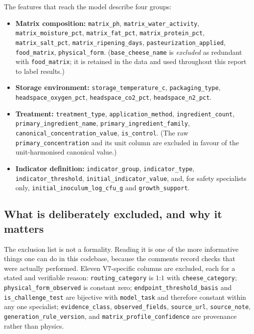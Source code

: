 The features that reach the model describe four groups:

\begin{itemize}[leftmargin=1.3em, itemsep=1pt]
\item \textbf{Matrix composition:} \texttt{matrix\_ph},
  \texttt{matrix\_water\_activity}, \texttt{matrix\_moisture\_pct},
  \texttt{matrix\_fat\_pct}, \texttt{matrix\_protein\_pct},
  \texttt{matrix\_salt\_pct}, \texttt{matrix\_ripening\_days},
  \texttt{pasteurization\_applied}, \texttt{food\_matrix},
  \texttt{physical\_form}. (\texttt{base\_cheese\_name} is \emph{excluded}
  as redundant with \texttt{food\_matrix}; it is retained in the data and
  used throughout this report to label results.)
\item \textbf{Storage environment:} \texttt{storage\_temperature\_c},
  \texttt{packaging\_type}, \texttt{headspace\_oxygen\_pct},
  \texttt{headspace\_co2\_pct}, \texttt{headspace\_n2\_pct}.
\item \textbf{Treatment:} \texttt{treatment\_type},
  \texttt{application\_method}, \texttt{ingredient\_count},
  \texttt{primary\_ingredient\_name}, \texttt{primary\_ingredient\_family},
  \texttt{canonical\_concentration\_value}, \texttt{is\_control}. (The raw
  \texttt{primary\_concentration} and its unit column are excluded in
  favour of the unit-harmonised canonical value.)
\item \textbf{Indicator definition:} \texttt{indicator\_group},
  \texttt{indicator\_type}, \texttt{indicator\_threshold},
  \texttt{initial\_indicator\_value}, and, for safety specialists only,
  \texttt{initial\_inoculum\_log\_cfu\_g} and \texttt{growth\_support}.
\end{itemize}

\subsection{What is deliberately excluded, and why it matters}
\label{sec:exclusions}

The exclusion list is not a formality. Reading it is one of the more
informative things one can do in this codebase, because the comments record
checks that were actually performed. Eleven V7-specific columns are
excluded, each for a stated and verifiable reason: \texttt{routing\_category}
is $1$:$1$ with \texttt{cheese\_category};
\texttt{physical\_form\_observed} is constant zero;
\texttt{endpoint\_threshold\_basis} and \texttt{is\_challenge\_test} are
bijective with \texttt{model\_task} and therefore constant within any one
specialist; \texttt{evidence\_class}, \texttt{observed\_fields},
\texttt{source\_url}, \texttt{source\_note},
\texttt{generation\_rule\_version}, and \texttt{matrix\_profile\_confidence}
are provenance rather than physics.

